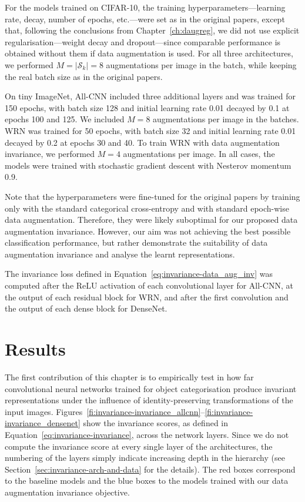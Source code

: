 {For the models trained on CIFAR-10, the training hyperparameters---learning rate, decay, number of epochs, etc.---were set as in the original papers, except that, following the conclusions from Chapter~\ref{ch:daugreg}, we did not use explicit regularisation---weight decay and dropout---since comparable performance is obtained without them if data augmentation is used. For all three architectures, we performed $M=|\mathcal{S}_{k}|=8$ augmentations per image in the batch, while keeping the real batch size as in the original papers.

On tiny ImageNet, All-CNN included three additional layers and was trained for 150 epochs, with batch size 128 and initial learning rate 0.01 decayed by 0.1 at epochs 100 and 125. We included $M=8$ augmentations per image in the batches. WRN was trained for 50 epochs, with batch size 32 and initial learning rate 0.01 decayed by 0.2 at epochs 30 and 40. To train WRN with data augmentation invariance, we performed $M=4$ augmentations per image. In all cases, the models were trained with stochastic gradient descent with Nesterov momentum 0.9. 

Note that the hyperparameters were fine-tuned for the original papers by training only with the standard categorical cross-entropy and with standard epoch-wise data augmentation. Therefore, they were likely suboptimal for our proposed data augmentation invariance. However, our aim was not achieving the best possible classification performance, but rather demonstrate the suitability of data augmentation invariance and analyse the learnt representations.

The invariance loss defined in Equation~\ref{eq:invariance-data_aug_inv} was computed after the ReLU activation of each convolutional layer for All-CNN, at the output of each residual block for WRN, and after the first convolution and the output of each dense block for DenseNet.

\section{Results}
\label{sec:invariance-results}
The first contribution of this chapter is to empirically test in how far convolutional neural networks trained for object categorisation produce invariant representations under the influence of identity-preserving transformations of the input images. Figures~\ref{fi:invariance-invariance_allcnn}--\ref{fi:invariance-invariance_densenet} show the invariance scores, as defined in Equation~\ref{eq:invariance-invariance}, across the network layers. Since we do not compute the invariance score at every single layer of the architectures, the numbering of the layers simply indicate increasing depth in the hierarchy (see Section~\ref{sec:invariance-arch-and-data} for the details). The red boxes correspond to the baseline models and the blue boxes to the models trained with our data augmentation invariance objective.

}
